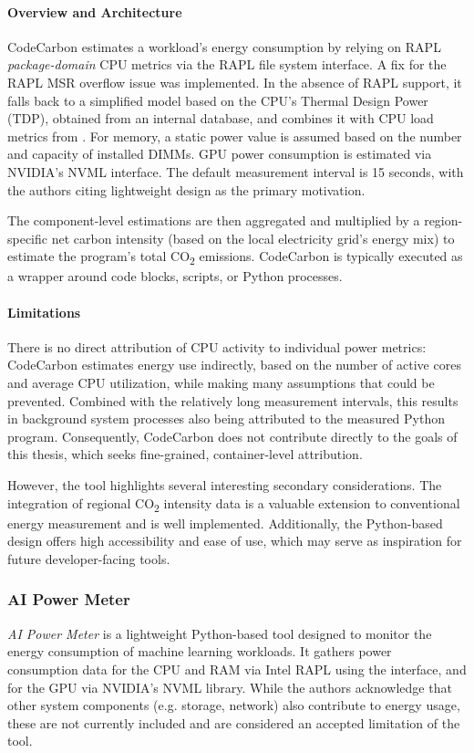 \paragraph{Overview and Architecture}
CodeCarbon estimates a workload’s energy consumption by relying on RAPL \textit{package-domain} CPU metrics via the  RAPL file system interface. A fix for the RAPL MSR overflow issue was implemented\parencite{codecarbon_issue_322}. In the absence of RAPL support, it falls back to a simplified model based on the CPU’s Thermal Design Power (TDP), obtained from an internal database, and combines it with CPU load metrics from . For memory, a static power value is assumed based on the number and capacity of installed DIMMs. GPU power consumption is estimated via NVIDIA’s NVML interface. The default measurement interval is 15 seconds, with the authors citing lightweight design as the primary motivation.

The component-level estimations are then aggregated and multiplied by a region-specific net carbon intensity (based on the local electricity grid’s energy mix) to estimate the program’s total CO\textsubscript{2} emissions. CodeCarbon is typically executed as a wrapper around code blocks, scripts, or Python processes.

\paragraph{Limitations}
There is no direct attribution of CPU activity to individual power metrics: CodeCarbon estimates energy use indirectly, based on the number of active cores and average CPU utilization, while making many assumptions that could be prevented. Combined with the relatively long measurement intervals, this results in background system processes also being attributed to the measured Python program. Consequently, CodeCarbon does not contribute directly to the goals of this thesis, which seeks fine-grained, container-level attribution.

However, the tool highlights several interesting secondary considerations. The integration of regional CO\textsubscript{2} intensity data is a valuable extension to conventional energy measurement and is well implemented. Additionally, the Python-based design offers high accessibility and ease of use, which may serve as inspiration for future developer-facing tools.

\subsubsection{AI Power Meter}
\textit{AI Power Meter}\parencite{aipowermeter} is a lightweight Python-based tool designed to monitor the energy consumption of machine learning workloads. It gathers power consumption data for the CPU and RAM via Intel RAPL using the  interface, and for the GPU via NVIDIA’s NVML library. While the authors acknowledge that other system components (e.g. storage, network) also contribute to energy usage, these are not currently included and are considered an accepted limitation of the tool.

